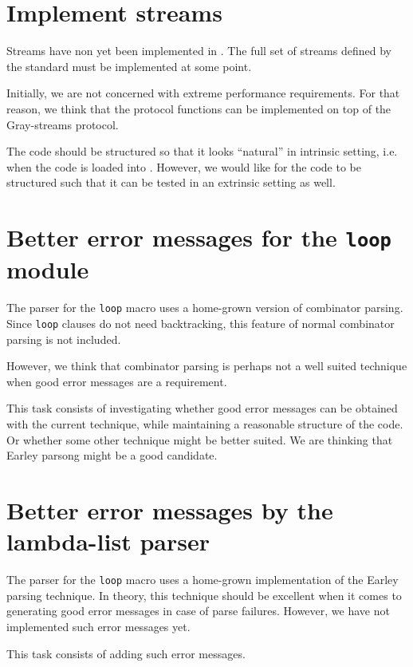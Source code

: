 \section{Implement streams}

Streams have non yet been implemented in \sysname{}.  The full set of
streams defined by the standard must be implemented at some point.

Initially, we are not concerned with extreme performance
requirements.  For that reason, we think that the protocol functions
can be implemented on top of the Gray-streams protocol.

The code should be structured so that it looks ``natural'' in
intrinsic setting, i.e. when the code is loaded into \sysname{}.
However, we would like for the code to be structured such that it can
be tested in an extrinsic setting as well.

\section{Better error messages for the \texttt{loop} module}

The parser for the \texttt{loop} macro uses a home-grown version of
combinator parsing.  Since \texttt{loop} clauses do not need
backtracking, this feature of normal combinator parsing is not
included.

However, we think that combinator parsing is perhaps not a well suited
technique when good error messages are a requirement.

This task consists of investigating whether good error messages can be
obtained with the current technique, while maintaining a reasonable
structure of the code.  Or whether some other technique might be
better suited.  We are thinking that Earley parsong might be a good
candidate.

\section{Better error messages by the lambda-list parser}

The parser for the \texttt{loop} macro uses a home-grown
implementation of the Earley parsing technique.  In theory, this
technique should be excellent when it comes to generating good error
messages in case of parse failures.  However, we have not implemented
such error messages yet.

This task consists of adding such error messages.
